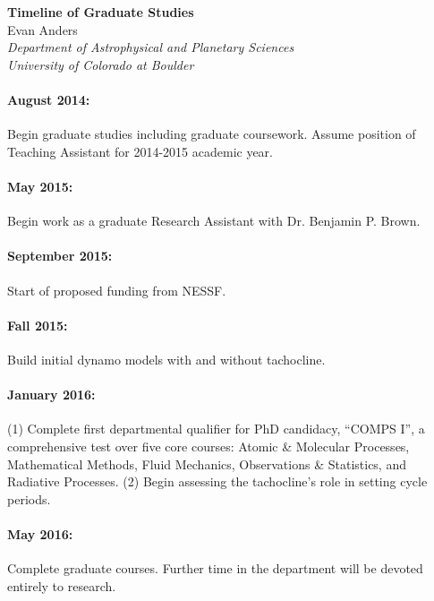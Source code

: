\documentclass[aasms,12pt]{article}
\begin{document}
\begin{center}
   \large\textbf{Timeline of Graduate Studies}\\
   \vspace{0.4cm}
   \large{Evan Anders}\\
   \normalsize\textit{Department of Astrophysical and Planetary Sciences}\\
   \normalsize\textit{University of Colorado at Boulder}\\
\end{center}

\paragraph{August 2014:} Begin graduate studies including graduate coursework.
	Assume position of Teaching Assistant for 2014-2015 academic year.
\vspace{-0.4cm}
\paragraph{May 2015:} Begin work as a graduate Research Assistant with
	Dr. Benjamin P. Brown.

\vspace{-0.4cm}
\paragraph{September 2015:} Start of proposed funding from NESSF.

\vspace{-0.4cm}
\paragraph{Fall 2015:} Build initial dynamo models with and without tachocline.

\vspace{-0.4cm}
\paragraph{January 2016:} (1) Complete first departmental qualifier for PhD candidacy,
``COMPS I'', a comprehensive test over five core courses: Atomic \& Molecular Processes,
Mathematical Methods, Fluid Mechanics, Observations \& Statistics, and Radiative
Processes.  (2) Begin assessing the tachocline's role in setting cycle periods.

\vspace{-0.4cm}
\paragraph{May 2016:} Complete graduate courses.  Further time in the department
will be devoted entirely to research.
\end{document}
